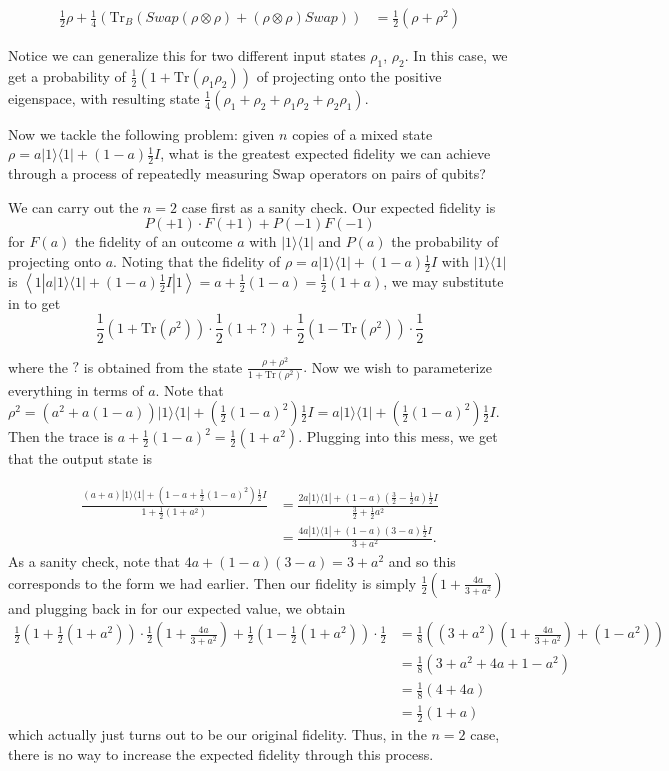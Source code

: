 \documentclass[a4paper]{article}
\newcommand\0{\mathbf{0}}
\def\Tr{\textrm{Tr}}
\newcommand{\ketbra}[2]{|{#1}\>\!\<#2|}
\newcommand{\bracketsub}[3]{\left\<{#1}\left|{#2}\right|{#3}\right\>}
\newcommand\<{\langle}
\renewcommand\>{\rangle}
\begin{document}
\begin{align*}
    \frac{1}{2}\rho + \frac{1}{4}(\Tr_B(Swap(\rho\otimes\rho) + (\rho\otimes\rho)Swap)) &= \frac{1}{2}(\rho+\rho^2)
\end{align*}

Notice we can generalize this for two different input states $\rho_1$, $\rho_2$. In this case, we get a probability of $\frac{1}{2}(1+\Tr(\rho_1\rho_2))$ of projecting onto the positive eigenspace, with resulting state $\frac{1}{4}(\rho_1+\rho_2+\rho_1\rho_2+\rho_2\rho_1)$. 

Now we tackle the following problem: given $n$ copies of a mixed state $\rho = a\ketbra{1}{1}+(1-a)\frac{1}{2}I$, what is the greatest expected fidelity we can achieve through a process of repeatedly measuring Swap operators on pairs of qubits? 

We can carry out the $n=2$ case first as a sanity check. Our expected fidelity is $$P(+1) \cdot F(+1) + P(-1)F(-1)$$ for $F(a)$ the fidelity of an outcome $a$ with $\ketbra{1}{1}$ and $P(a)$ the probability of projecting onto $a$. Noting that the fidelity of $\rho = a\ketbra{1}{1} + (1-a)\frac{1}{2}I$ with $\ketbra{1}{1}$ is $\bracketsub{1}{a\ketbra{1}{1}+(1-a)\frac{1}{2}I}{1} = a + \frac{1}{2}(1-a) = \frac{1}{2}(1+a)$, we may substitute in to get $$\frac{1}{2}(1+\Tr(\rho^2))\cdot \frac{1}{2}(1+?) + \frac{1}{2}(1-\Tr(\rho^2))\cdot \frac{1}{2}$$

where the $?$ is obtained from the state $\frac{\rho+\rho^2}{1+\Tr(\rho^2)}.$ Now we wish to parameterize everything in terms of $a$. Note that $\rho^2 = (a^2+a(1-a))\ketbra{1}{1} + (\frac{1}{2}(1-a)^2) \frac{1}{2}I = a\ketbra{1}{1} + (\frac{1}{2}(1-a)^2)\frac{1}{2}I$. Then the trace is $a + \frac{1}{2}(1-a)^2 = \frac{1}{2}(1+a^2)$. Plugging into this mess, we get that the output state is 

\begin{align*}
    \frac{(a+a)\ketbra{1}{1} + (1-a + \frac{1}{2}(1-a)^2)\frac{1}{2}I}{1+\frac{1}{2}(1+a^2)} &= \frac{2a\ketbra{1}{1} + (1-a)(\frac{3}{2}-\frac{1}{2}a)\frac{1}{2}I}{\frac{3}{2} + \frac{1}{2}a^2} \\
    &= \frac{4a\ketbra{1}{1} + (1-a)(3-a)\frac{1}{2}I}{3+a^2}.
\end{align*}
As a sanity check, note that $4a+(1-a)(3-a) = 3+a^2$ and so this corresponds to the form we had earlier. Then our fidelity is simply $\frac{1}{2}(1+\frac{4a}{3+a^2})$ and plugging back in for our expected value, we obtain 
\begin{align*}
    \frac{1}{2}(1+\frac{1}{2}(1+a^2)) \cdot \frac{1}{2}(1+ \frac{4a}{3+a^2}) + \frac{1}{2}(1-\frac{1}{2}(1+a^2))\cdot \frac{1}{2} &= \frac{1}{8} ((3+a^2) ( 1+\frac{4a}{3+a^2}) + (1-a^2)) \\
    &= \frac{1}{8} (3+a^2 + 4a + 1-a^2) \\
    &= \frac{1}{8} (4+4a) \\
    &= \frac{1}{2}(1+a)
\end{align*}
which actually just turns out to be our original fidelity. Thus, in the $n=2$ case, there is no way to increase the expected fidelity through this process.
\end{document}
